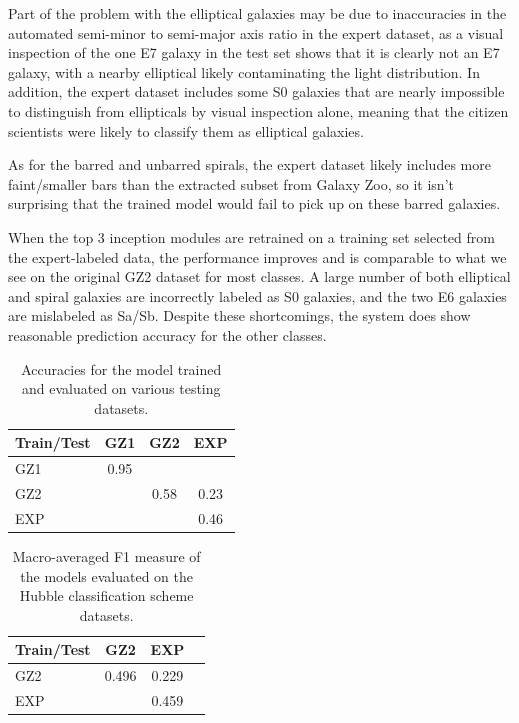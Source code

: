 \documentclass{article}
\begin{document}
Part of the problem with the elliptical galaxies may be due to inaccuracies in the automated semi-minor to semi-major axis ratio in the expert dataset, as a visual inspection of the one E7 galaxy in the test set shows that it is clearly not an E7 galaxy, with a nearby elliptical likely contaminating the light distribution. In addition, the expert dataset includes some S0 galaxies that are nearly impossible to distinguish from ellipticals by visual inspection alone, meaning that the citizen scientists were likely to classify them as elliptical galaxies.

As for the barred and unbarred spirals, the expert dataset likely includes more faint/smaller bars than the extracted subset from Galaxy Zoo, so it isn't surprising that the trained model would fail to pick up on these barred galaxies.

When the top 3 inception modules are retrained on a training set selected from the expert-labeled data, the performance improves and is comparable to what we see on the original GZ2 dataset for most classes. A large number of both elliptical and spiral galaxies are incorrectly labeled as S0 galaxies, and the two E6 galaxies are mislabeled as Sa/Sb. Despite these shortcomings, the system does show reasonable prediction accuracy for the other classes.  


\begin{table}
\begin{center}
\begin{tabular}{l|c|c|c}
Train/Test	&	GZ1		&	GZ2		&	EXP		\\ \hline
GZ1			&	0.95	&			&			\\
GZ2			&			&	0.58	&	0.23	\\
EXP			&			&			&	0.46
\end{tabular}
\end{center}
\caption{Accuracies for the model trained and evaluated on various testing datasets.}
\end{table}

\begin{table}
\begin{center}
\begin{tabular}{l|c|c|c}
Train/Test	&	GZ2		&	EXP			\\ \hline
GZ2			&	0.496	&	0.229		\\
EXP			&			&	0.459
\end{tabular}
\end{center}
\caption{Macro-averaged F1 measure of the models evaluated on the Hubble classification scheme datasets.}
\end{table}
\end{document}
